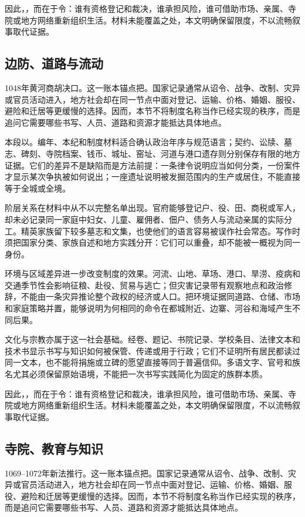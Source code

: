 因此，，而在于令：谁有资格登记和裁决，谁承担风险，谁可借助市场、亲属、寺院或地方网络重新组织生活。材料未能覆盖之处，本文明确保留限度，不以流畅叙事取代证据。

\subsection{边防、道路与流动}

1048年黄河商胡决口。这一账本锚点把。国家记录通常从诏令、战争、改制、灾异或官员活动进入，地方社会却在同一节点中面对登记、运输、价格、婚姻、服役、避险和迁居等更缓慢的选择。因而，本节不将制度名称当作已经实现的秩序，而是追问它需要哪些书写、人员、道路和资源才能抵达具体地点。

本段以。编年、本纪和制度材料适合确认政治年序与规范语言；契约、讼牍、墓志、碑刻、寺院档案、钱币、城址、窑址、河道与港口遗存则分别保存有限的地方证据。它们的差异不是缺陷而是方法前提：一条律令说明应当如何分类，一份案件才显示某次争执被如何说出；一座遗址说明被发掘范围内的生产或居住，不能直接等于全城或全境。

阶层关系在材料中从不以完整名单出现。官府能够登记户、役、田、商税或军人，却未必记录同一家庭中妇女、儿童、雇佣者、佃户、债务人与流动亲属的实际分工。精英家族留下较多墓志和文集，也使他们的语言容易被误作社会常态。写作时须把国家分类、家族自述和地方实践分开：它们可以重叠，却不能被一概视为同一身份。

环境与区域差异进一步改变制度的效果。河流、山地、草场、港口、旱涝、疫病和交通季节性会影响征粮、赴役、贸易与逃亡；但灾害记录带有观察地点和政治修辞，不能由一条灾异推论整个政权的经济或人口。把环境证据同道路、仓储、市场和家庭策略并置，能够说明为何相同的命令在都城附近、边寨、河谷和海域产生不同后果。

文化与宗教亦属于这一社会基础。经卷、题记、书院记录、学校条目、法律文本和技术书显示书写与知识如何被保管、传递或用于行政；它们不证明所有居民都读过同一文本，也不能将捐施或立碑的愿望直接等同于普遍信仰。多语文字、官号和族名尤其必须保留原始语境，不能把一次书写实践简化为固定的族群本质。

因此，，而在于令：谁有资格登记和裁决，谁承担风险，谁可借助市场、亲属、寺院或地方网络重新组织生活。材料未能覆盖之处，本文明确保留限度，不以流畅叙事取代证据。

\subsection{寺院、教育与知识}

1069--1072年新法推行。这一账本锚点把。国家记录通常从诏令、战争、改制、灾异或官员活动进入，地方社会却在同一节点中面对登记、运输、价格、婚姻、服役、避险和迁居等更缓慢的选择。因而，本节不将制度名称当作已经实现的秩序，而是追问它需要哪些书写、人员、道路和资源才能抵达具体地点。

